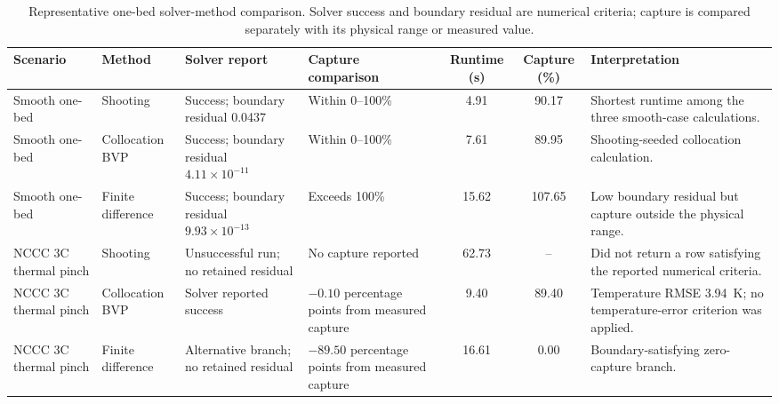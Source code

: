 \begin{table}[pos=htbp]
  \centering
  \caption{Representative one-bed solver-method comparison. Solver success and boundary residual are numerical criteria; capture is compared separately with its physical range or measured value.}
  \label{tab:method-case-contrast}
  \scriptsize
  \renewcommand{\arraystretch}{1.08}
  \setlength{\tabcolsep}{2pt}
  \begin{tabularx}{\textwidth}{@{}p{} p{} p{} p{}
    S[table-format=2.2] S[table-format=3.2] X@{}}
    \toprule
    Scenario & Method & Solver report & Capture comparison & {Runtime (\unit{s})} & {Capture (\unit{\percent})} & Interpretation \\
    \midrule
        Smooth one-bed & Shooting & Success; boundary residual 0.0437 & Within 0--100\% & 4.91 & 90.17 & Shortest runtime among the three smooth-case calculations. \\
        Smooth one-bed & Collocation BVP & Success; boundary residual $4.11\times10^{-11}$ & Within 0--100\% & 7.61 & 89.95 & Shooting-seeded collocation calculation. \\
        Smooth one-bed & Finite difference & Success; boundary residual $9.93\times10^{-13}$ & Exceeds 100\% & 15.62 & 107.65 & Low boundary residual but capture outside the physical range. \\
        NCCC 3C thermal pinch & Shooting & Unsuccessful run; no retained residual & No capture reported & 62.73 & {--} & Did not return a row satisfying the reported numerical criteria. \\
        NCCC 3C thermal pinch & Collocation BVP & Solver reported success & $-0.10$ percentage points from measured capture & 9.40 & 89.40 & Temperature RMSE \qty{3.94}{K}; no temperature-error criterion was applied. \\
        NCCC 3C thermal pinch & Finite difference & Alternative branch; no retained residual & $-89.50$ percentage points from measured capture & 16.61 & 0.00 & Boundary-satisfying zero-capture branch. \\
        \bottomrule
  \end{tabularx}
\end{table}
